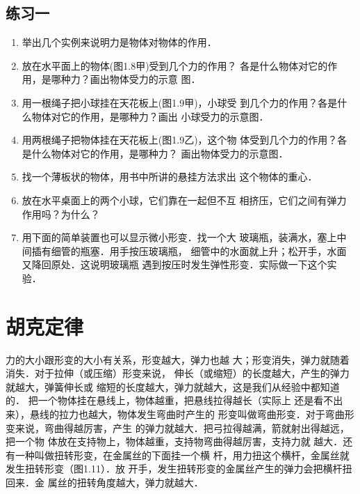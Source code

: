 \subsection*{练习一}
\begin{enumerate}
\item  举出几个实例来说明力是物体对物体的作用．
\item 放在水平面上的物体(图1.8甲)受到几个力的作用？
  各是什么物体对它的作用，是哪种力？画出物体受力的示意
  图．
\item 用一根绳子把小球挂在天花板上(图1.9甲)，小球受
  到几个力的作用？各是什么物体对它的作用，是哪种力？画出
  小球受力的示意图．
\item 用两根绳子把物体挂在天花板上(图1.9乙)，这个物
  体受到几个力的作用？各是什么物体对它的作用，是哪种力？
  画出物体受力的示意图．
 \item 找一个薄板状的物体，用书中所讲的悬挂方法求出
  这个物体的重心．
 \item 放在水平桌面上的两个小球，它们靠在一起但不互
相挤压，它们之间有弹力作用吗？为什么？
\item 用下面的简单装置也可以显示微小形变．找一个大
玻璃瓶，装满水，塞上中间插有细管的瓶塞．用手按压玻璃瓶，
细管中的水面就上升；松开手，水面又降回原处．这说明玻璃瓶
遇到按压时发生弹性形变．实际做一下这个实验．
\end{enumerate}

\section{胡克定律}
力的大小跟形变的大小有关系，形变越大，弹力也越
大；形变消失，弹力就随着消失．对于拉伸（或压缩）形变来说，
伸长（或缩短）的长度越大，产生的弹力就越大，弹簧伸长或
缩短的长度越大，弹力就越大，这是我们从经验中都知道的．
把一个物体挂在悬线上，物体越重，把悬线拉得越长（实际上
还是看不出来），悬线的拉力也越大，物体发生弯曲时产生的
形变叫做弯曲形变．对于弯曲形变来说，弯曲得越厉害，产生
的弹力就越大．把弓拉得越满，箭就射出得越远，把一个物
体放在支持物上，物体越重，支持物弯曲得越厉害，支持力就
越大．还有一种叫做扭转形变，在金属丝的下面挂一个横
杆，用力扭这个横杆，金属丝就发生扭转形变（图1.11）．放
开手，发生扭转形变的金属丝产生的弹力会把横杆扭回来．金
属丝的扭转角度越大，弹力就越大．

